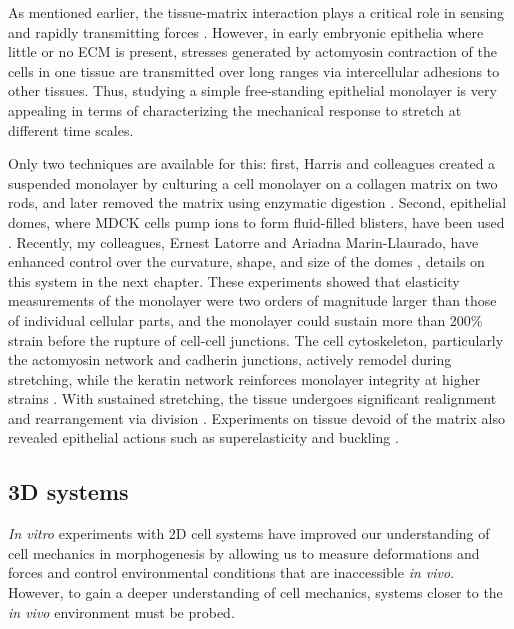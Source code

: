 As mentioned earlier, the tissue-matrix interaction plays a critical role in sensing and rapidly transmitting forces \cite{tambe2011, sunyer2016, serra-picamal2012}. However, in early embryonic epithelia where little or no ECM is present, stresses generated by actomyosin contraction of the cells in one tissue are transmitted over long ranges via intercellular adhesions to other tissues. Thus, studying a simple free-standing epithelial monolayer is very appealing in terms of characterizing the mechanical response to stretch at different time scales.

Only two techniques are available for this: first, Harris and colleagues created a suspended monolayer by culturing a cell monolayer on a collagen matrix on two rods, and later removed the matrix using enzymatic digestion \cite{harris2012}. Second, epithelial domes, where MDCK cells pump ions to form fluid-filled blisters, have been used \cite{lever1979}. Recently, my colleagues, Ernest Latorre and Ariadna Marin-Llaurado, have enhanced control over the curvature, shape, and size of the domes \cite{latorre2018, marin-llaurado2022}, details on this system in the next chapter. These experiments showed that elasticity measurements of the monolayer were two orders of magnitude larger than those of individual cellular parts, and the monolayer could sustain more than 200\% strain before the rupture of cell-cell junctions. The cell cytoskeleton, particularly the actomyosin network and cadherin junctions, actively remodel during stretching, while the keratin network reinforces monolayer integrity at higher strains \cite{latorre2018, duque2023}. With sustained stretching, the tissue undergoes significant realignment and rearrangement via division \cite{wyatt2015}. Experiments on tissue devoid of the matrix also revealed epithelial actions such as superelasticity and buckling \cite{latorre2018, wyatt2020}.

\hypertarget{d-systems}{%
\subsection{3D systems}\label{d-systems}}

\textit{In vitro} experiments with 2D cell systems have improved our understanding of cell mechanics in morphogenesis by allowing us to measure deformations and forces and control environmental conditions that are inaccessible \textit{in vivo}. However, to gain a deeper understanding of cell mechanics, systems closer to the \textit{in vivo} environment must be probed.

